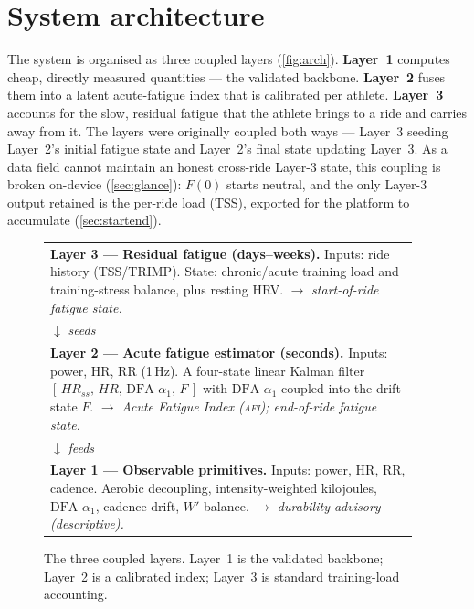 \documentclass[11pt]{article}
\newcommand{\afi}{\textup{\textsc{afi}}}
\newcommand{\aone}{\ensuremath{\text{DFA-}\alpha_1}}
\newcommand{\Fstate}{\ensuremath{F}}
\begin{document}
\section{System architecture}\label{sec:arch}

The system is organised as three coupled layers (\autoref{fig:arch}). \textbf{Layer~1} computes cheap, directly measured quantities --- the validated backbone. \textbf{Layer~2} fuses them into a latent acute-fatigue index that is calibrated per athlete. \textbf{Layer~3} accounts for the slow, residual fatigue that the athlete brings to a ride and carries away from it. The layers were originally coupled both ways --- Layer~3 seeding Layer~2's initial fatigue state and Layer~2's final state updating Layer~3. As a data field cannot maintain an honest cross-ride Layer-3 state, this coupling is broken on-device (\autoref{sec:glance}): $\Fstate(0)$ starts neutral, and the only Layer-3 output retained is the per-ride load (TSS), exported for the platform to accumulate (\autoref{sec:startend}).

\begin{figure}[h]
\centering
\small
\setlength{\fboxsep}{6pt}
\begin{tabular}{@{}p{0.95\linewidth}@{}}
\toprule
\textbf{Layer 3 --- Residual fatigue (days--weeks).} Inputs: ride history (TSS/TRIMP). State: chronic/acute training load and training-stress balance, plus resting HRV. $\rightarrow$ \emph{start-of-ride fatigue state.}\\[4pt]
\hspace{2em}$\downarrow$ \emph{seeds}\\[4pt]
\textbf{Layer 2 --- Acute fatigue estimator (seconds).} Inputs: power, HR, RR (1\,Hz). A four-state linear Kalman filter $[\,HR_{ss},\,HR,\,\aone,\,\Fstate\,]$ with $\aone$ coupled into the drift state $\Fstate$. $\rightarrow$ \emph{Acute Fatigue Index (\afi); end-of-ride fatigue state.}\\[4pt]
\hspace{2em}$\downarrow$ \emph{feeds}\\[4pt]
\textbf{Layer 1 --- Observable primitives.} Inputs: power, HR, RR, cadence. Aerobic decoupling, intensity-weighted kilojoules, $\aone$, cadence drift, $W'$ balance. $\rightarrow$ \emph{durability advisory (descriptive).}\\
\bottomrule
\end{tabular}
\caption{The three coupled layers. Layer~1 is the validated backbone; Layer~2 is a calibrated index; Layer~3 is standard training-load accounting.}
\label{fig:arch}
\end{figure}
\end{document}
